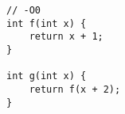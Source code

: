 \begin{lstlisting}[title=\href{https://godbolt.org/z/8W_KZV}{\texttt{godbolt.org/z/8W\_KZV}}]
// -O0
int f(int x) {
    return x + 1;
}

int g(int x) {
    return f(x + 2);
}
\end{lstlisting}

